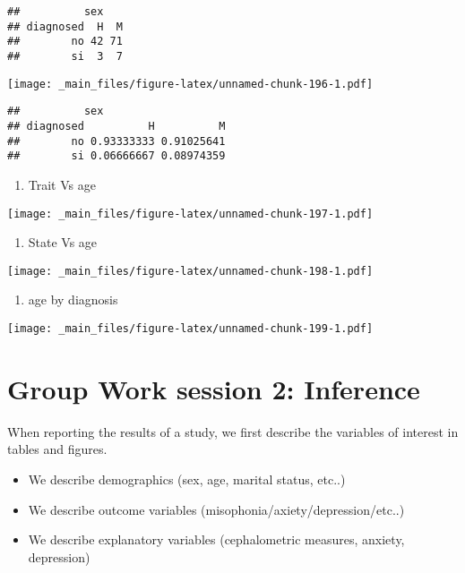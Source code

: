 \documentclass[
]{book}
\providecommand{\tightlist}{%
  \setlength{\itemsep}{0pt}\setlength{\parskip}{0pt}}
\begin{document}
\begin{verbatim}
##          sex
## diagnosed  H  M
##        no 42 71
##        si  3  7
\end{verbatim}

\texttt{[image: \_main\_files/figure-latex/unnamed-chunk-196-1.pdf]}

\begin{verbatim}
##          sex
## diagnosed          H          M
##        no 0.93333333 0.91025641
##        si 0.06666667 0.08974359
\end{verbatim}

\begin{enumerate}
\def\labelenumi{\alph{enumi}.}
\setcounter{enumi}{7}
\tightlist
\item
  Trait Vs age
\end{enumerate}

\texttt{[image: \_main\_files/figure-latex/unnamed-chunk-197-1.pdf]}

\begin{enumerate}
\def\labelenumi{\roman{enumi}.}
\tightlist
\item
  State Vs age
\end{enumerate}

\texttt{[image: \_main\_files/figure-latex/unnamed-chunk-198-1.pdf]}

\begin{enumerate}
\def\labelenumi{\alph{enumi}.}
\setcounter{enumi}{9}
\tightlist
\item
  age by diagnosis
\end{enumerate}

\texttt{[image: \_main\_files/figure-latex/unnamed-chunk-199-1.pdf]}

\hypertarget{group-work-session-2-inference}{%
\section{Group Work session 2: Inference}\label{group-work-session-2-inference}}

When reporting the results of a study, we first describe the variables of interest in tables and figures.

\begin{itemize}
\tightlist
\item
  We describe demographics (sex, age, marital status, etc..)
\item
  We describe outcome variables (misophonia/axiety/depression/etc..)
\item
  We describe explanatory variables (cephalometric measures, anxiety, depression)
\end{itemize}
\end{document}
